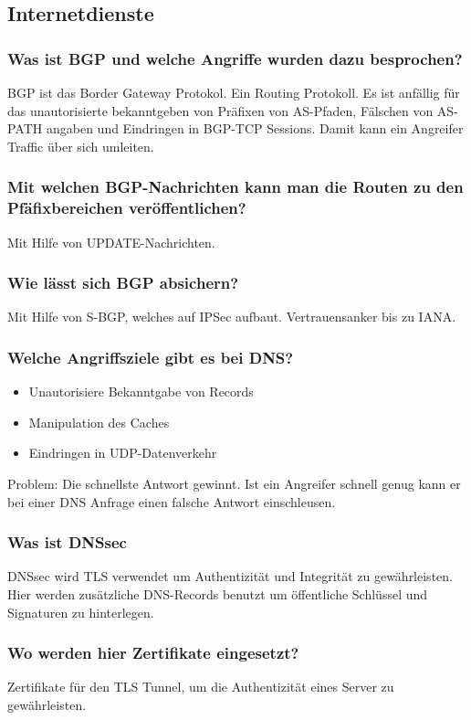 	\subsection{Internetdienste}
	
		\subsubsection{Was ist BGP und welche Angriffe wurden dazu besprochen?}
	BGP ist das Border Gateway Protokol. Ein Routing Protokoll. Es ist anfällig für das unautorisierte bekanntgeben von Präfixen von AS-Pfaden, Fälschen von AS-PATH angaben und Eindringen in BGP-TCP Sessions.
	Damit kann ein Angreifer Traffic über sich umleiten. 

	
	
	\subsubsection{Mit welchen BGP-Nachrichten kann man die Routen zu den Pfäfixbereichen veröffentlichen?}
	Mit Hilfe von UPDATE-Nachrichten.
	
	\subsubsection{Wie lässt sich BGP absichern?}
	Mit Hilfe von S-BGP, welches auf IPSec aufbaut. Vertrauensanker bis zu IANA.
	
	\subsubsection{Welche Angriffsziele gibt es bei DNS?}
	\begin{itemize}
		\item Unautorisiere Bekanntgabe von Records
		\item Manipulation des Caches
		\item Eindringen in UDP-Datenverkehr
	\end{itemize}
	Problem: Die schnellste Antwort gewinnt. Ist ein Angreifer schnell genug kann er bei einer DNS Anfrage einen falsche Antwort einschleusen.
	\subsubsection{Was ist DNSsec}
	DNSsec wird TLS verwendet um Authentizität und Integrität zu gewährleisten.
	Hier werden zusätzliche DNS-Records benutzt um öffentliche Schlüssel und Signaturen zu hinterlegen.
	
	\subsubsection{Wo werden hier Zertifikate eingesetzt?}
	Zertifikate für den TLS Tunnel, um die Authentizität eines Server zu gewährleisten. 
	
